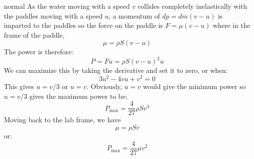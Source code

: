 \begin{solution}{normal}
As the water moving with a speed $v$ collides completely inelastically with the paddles moving with a speed $u$, a momentum of $dp=dm(v-u)$ is imparted to the paddles so the force on the paddle is $F=\mu(v-u)$ where in the frame of the paddle,
$$\mu=\rho S(v-u)$$The power is therefore:
$$P=Fu=\rho S(v-u)^2u$$We can maximize this by taking the derivative and set it to zero, or when:
$$3u^2-4vu+v^2=0$$This gives $u=v/3$ or $u=v$. Obviously, $u=v$ would give the minimum power so $u=v/3$ gives the maximum power to be:
$$P_\text{max}=\frac{4}{27}\rho S v^3$$Moving back to the lab frame, we have
$$\mu=\rho Sv$$or:
$$\boxed{P_\text{max}=\frac{4}{27}\mu v^2}$$
\end{solution}
